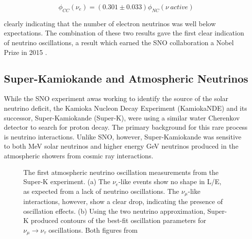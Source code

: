 \begin{equation}
\phi_{CC}\left(\nu_e\right) = \left( 0.301 \pm 0.033 \right) \phi_{NC} \left( \nu \ active \right)
\end{equation}

clearly indicating that the number of electron neutrinos was well below expectations.
The combination of these two results gave the first clear indication of neutrino oscillations, a result which earned the SNO collaboration a Nobel Prize in 2015 \cite{NobelPrize:2015-Oscillations}.

\label{subsec:superk_atmo}
\subsection{Super-Kamiokande and Atmospheric Neutrinos}
While the SNO experiment awas working to identify the source of the solar neutrino deficit, the Kamioka Nucleon Decay Experiment (KamiokaNDE) and its successor, Super-Kamiokande (Super-K), were using a similar water Cherenkov detector to search for proton decay.
The primary background for this rare process is neutrino interactions.
Unlike SNO, however, Super-Kamiokande was sensitive to both MeV solar neutrinos and higher energy GeV neutrinos produced in the atmospheric showers from cosmic ray interactions. 

\begin{figure}[!h]%
	\centering
	\caption{The first atmospheric neutrino oscillation measurements from the Super-K experiment. (a) The $\nu_e$-like events show no shape in L/E, as expected from a lack of neutrino oscillations. The $\nu_\mu$-like interactions, however, show a clear drop, indicating the presence of oscillation effects. (b) Using the two neutrino approximation, Super-K produced contours of the best-fit oscillation parameters for $\nu_\mu\rightarrow\nu_\tau$ oscillations. Both figures from \cite{SuperK-Oscillations}}%
\end{figure}


